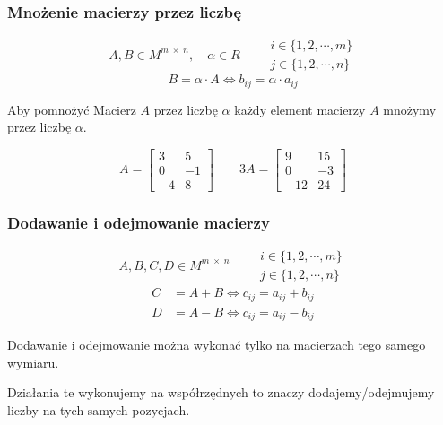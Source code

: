 \documentclass[../Matematyka.tex]{subfiles}
\begin{document}
    \subsubsection{Mnożenie macierzy przez liczbę}
    \begin{displaymath}
        A,B \in M^{m\;\times\;n},\quad
        \alpha \in R \qquad
        \substack
        {
            i \in \{1,2, \cdots,m\}\\
            j \in \{1,2, \cdots,n\}
        }
    \end{displaymath}
    \[B = \alpha \cdot A \iff b_{ij} = \alpha \cdot a_{ij}\]

    Aby pomnożyć Macierz \(A\) przez liczbę \(\alpha\) każdy element macierzy \(A\) mnożymy przez liczbę \(\alpha\).

    \begin{displaymath}
        A = 
        \begin{bmatrix}
            3  & 5  \\
            0  & -1 \\
            -4 & 8
        \end{bmatrix}\qquad
        3A = 
        \begin{bmatrix}
            9   & 15 \\
            0   & -3 \\
            -12 & 24
        \end{bmatrix}
    \end{displaymath}

    \subsubsection{Dodawanie i odejmowanie macierzy}
    \begin{displaymath}
        A,B,C,D \in M^{m\;\times\;n}\qquad
        \substack
        {
            i \in \{1,2, \cdots,m\}\\
            j \in \{1,2, \cdots,n\}
        }
    \end{displaymath}
    \begin{align*}
        C &= A + B \iff c_{ij} = a_{ij} + b_{ij}\\
        D &= A - B \iff c_{ij} = a_{ij} - b_{ij}
    \end{align*}

    Dodawanie i odejmowanie można wykonać tylko na macierzach tego samego wymiaru.\par
    Działania te wykonujemy na współrzędnych to znaczy dodajemy/odejmujemy liczby na tych samych pozycjach.
\end{document}
